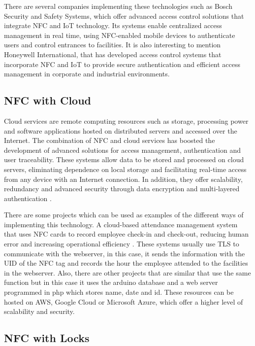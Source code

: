 There are several companies implementing these technologies such as Bosch Security and Safety Systems, which offer advanced access control solutions that integrate NFC and IoT technology. Its systems enable centralized access management in real time, using NFC-enabled mobile devices to authenticate users and control entrances to facilities. It is also interesting to mention Honeywell International, that has developed access control systems that incorporate NFC and IoT to provide secure authentication and efficient access management in corporate and industrial environments.

\subsection{NFC with Cloud}

Cloud services are remote computing resources such as storage, processing power and software applications hosted on distributed servers and accessed over the Internet. The combination of NFC and cloud services has boosted the development of advanced solutions for access management, authentication and user traceability. These systems allow data to be stored and processed on cloud servers, eliminating dependence on local storage and facilitating real-time access from any device with an Internet connection. In addition, they offer scalability, redundancy and advanced security through data encryption and multi-layered authentication \cite{ref35}.

There are some projects which can be used as examples of the different ways of implementing this technology. A cloud-based attendance management system that uses NFC cards to record employee check-in and check-out, reducing human error and increasing operational efficiency \cite{ref36}. These systems usually use TLS to communicate with the webserver, in this case, it sends the information with the UID of the NFC tag and records the hour the employee attended to the facilities in the webserver. Also, there are other projects that are similar \cite{ref37} that use the same function but in this case it uses the arduino database and a web server programmed in php which stores name, date and id. These resources can be hosted on AWS, Google Cloud or Microsoft Azure, which offer a higher level of scalability and security.

\subsection{NFC with Locks}

